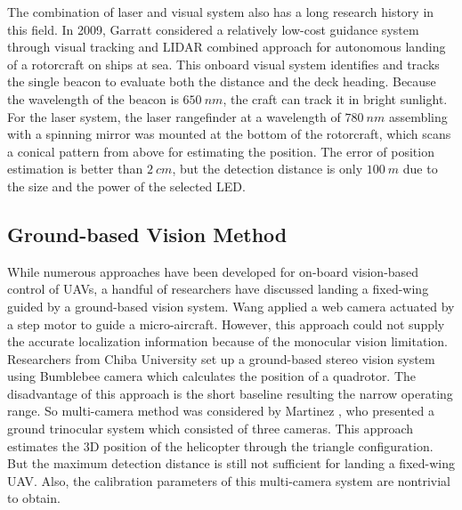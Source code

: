 
The combination of laser and visual system also has a long research history in this field. In 2009, Garratt \cite{garrattvisual2009} considered a relatively low-cost guidance system through visual tracking and LIDAR combined approach for autonomous landing of a rotorcraft on ships at sea. This onboard visual system identifies and tracks the single beacon to evaluate both the distance and the deck heading. Because the wavelength of the beacon is $650\ nm$, the craft can track it in bright sunlight. For the laser system, the laser rangefinder at a wavelength of $780\ nm$ assembling with a spinning mirror was mounted at the bottom of the rotorcraft, which scans a conical pattern from above for estimating the position. The error of position estimation is better than $2\ cm$, but the detection distance is only $100\ m$ due to the size and the power of the selected LED. 

\subsection{Ground-based Vision Method}
While numerous approaches have been developed for on-board vision-based control of UAVs, a handful of researchers have discussed landing a fixed-wing guided by a ground-based vision system. Wang applied a web camera actuated by a step motor to guide a micro-aircraft. However, this approach could not supply the accurate localization information because of the monocular vision limitation. Researchers from Chiba University\cite{pebrianti2010autonomous} set up a ground-based stereo vision system using Bumblebee camera which calculates the position of a quadrotor. The disadvantage of this approach is the short baseline resulting the narrow operating range. So multi-camera method was considered by Martinez \cite{Martínez2013}, who presented a ground trinocular system which consisted of three cameras. This approach estimates the 3D position of the helicopter through the triangle configuration. But the maximum detection distance is still not sufficient for landing a fixed-wing UAV. Also, the calibration parameters of this multi-camera system are nontrivial to obtain.

